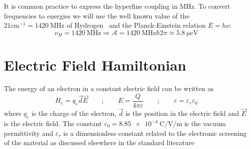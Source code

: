It is common practice to express the hyperfine coupling in $\si{\MHz}$. To convert frequencies to energies we will use the well known value of the $21\si{\cm^{-1}}=\SI{1420}{\MHz}$ of Hydrogen~\cite{Hellwig1970} and the Planck-Einstein relation $E=h\nu$:
\begin{equation}
  \nu_H = \SI{1420}{\MHz} \Rightarrow \mathcal{A} = \SI{1420}{\MHz}\hbar2\pi\simeq
  \SI{5.8}{\micro\eV}
\end{equation}


\section{Electric Field Hamiltonian}
The energy of an electron in a constant electric field can be written as~\cite{Castro2010a}
\begin{equation}
  H_e = q_e \vec{d} \vec{E} \qquad;\qquad E = \frac{Q}{4\pi\varepsilon} \qquad;\qquad
  \varepsilon = \varepsilon_r\varepsilon_0
\end{equation}
where $q_e$ is the charge of the electron, $\vec{d}$ is the position in the electric field and $\vec{E}$ is the electric field. The constant $\varepsilon_0 = \SI{8.85e-4}{\coulomb\per\volt\per\metre}$ is the vacuum permittivity and $\varepsilon_r$ is a dimensionless constant related to the electronic screening of the material as discussed elsewhere in the standard literature\cite{Castro2010a,Yamashiro2012}

